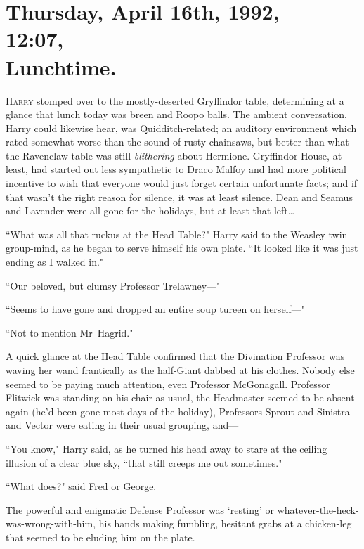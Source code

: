 
\section{Thursday, April 16th, 1992,\\
12:07\pm,\\
Lunchtime.}

\lettrine{H}{arry} stomped over to the mostly-deserted Gryffindor table, determining at a glance that lunch today was breen and Roopo balls. The ambient conversation, Harry could likewise hear, was Quidditch-related; an auditory environment which rated somewhat worse than the sound of rusty chainsaws, but better than what the Ravenclaw table was still \emph{blithering} about Hermione. Gryffindor House, at least, had started out less sympathetic to Draco Malfoy and had more political incentive to wish that everyone would just forget certain unfortunate facts; and if that wasn't the right reason for silence, it was at least silence. Dean and Seamus and Lavender were all gone for the holidays, but at least that left{\ldots}

``What was all that ruckus at the Head Table?" Harry said to the Weasley twin group-mind, as he began to serve himself his own plate. ``It looked like it was just ending as I walked in."

``Our beloved, but clumsy Professor Trelawney—"

``Seems to have gone and dropped an entire soup tureen on herself—"

``Not to mention Mr~Hagrid."

A quick glance at the Head Table confirmed that the Divination Professor was waving her wand frantically as the half-Giant dabbed at his clothes. Nobody else seemed to be paying much attention, even Professor McGonagall. Professor Flitwick was standing on his chair as usual, the Headmaster seemed to be absent again (he'd been gone most days of the holiday), Professors Sprout and Sinistra and Vector were eating in their usual grouping, and—

``You know," Harry said, as he turned his head away to stare at the ceiling illusion of a clear blue sky, ``that still creeps me out sometimes."

``What does?" said Fred or George.

The powerful and enigmatic Defense Professor was `resting' or whatever-the-heck-was-wrong-with-him, his hands making fumbling, hesitant grabs at a chicken-leg that seemed to be eluding him on the plate.

